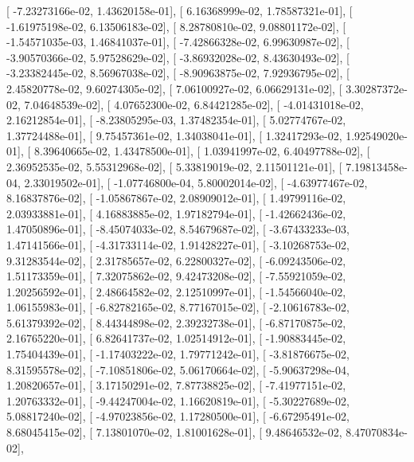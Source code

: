 \documentclass{article}
\begin{document}
       [ -7.23273166e-02,   1.43620158e-01],
       [  6.16368999e-02,   1.78587321e-01],
       [ -1.61975198e-02,   6.13506183e-02],
       [  8.28780810e-02,   9.08801172e-02],
       [ -1.54571035e-03,   1.46841037e-01],
       [ -7.42866328e-02,   6.99630987e-02],
       [ -3.90570366e-02,   5.97528629e-02],
       [ -3.86932028e-02,   8.43630493e-02],
       [ -3.23382445e-02,   8.56967038e-02],
       [ -8.90963875e-02,   7.92936795e-02],
       [  2.45820778e-02,   9.60274305e-02],
       [  7.06100927e-02,   6.06629131e-02],
       [  3.30287372e-02,   7.04648539e-02],
       [  4.07652300e-02,   6.84421285e-02],
       [ -4.01431018e-02,   2.16212854e-01],
       [ -8.23805295e-03,   1.37482354e-01],
       [  5.02774767e-02,   1.37724488e-01],
       [  9.75457361e-02,   1.34038041e-01],
       [  1.32417293e-02,   1.92549020e-01],
       [  8.39640665e-02,   1.43478500e-01],
       [  1.03941997e-02,   6.40497788e-02],
       [  2.36952535e-02,   5.55312968e-02],
       [  5.33819019e-02,   2.11501121e-01],
       [  7.19813458e-04,   2.33019502e-01],
       [ -1.07746800e-04,   5.80002014e-02],
       [ -4.63977467e-02,   8.16837876e-02],
       [ -1.05867867e-02,   2.08909012e-01],
       [  1.49799116e-02,   2.03933881e-01],
       [  4.16883885e-02,   1.97182794e-01],
       [ -1.42662436e-02,   1.47050896e-01],
       [ -8.45074033e-02,   8.54679687e-02],
       [ -3.67433233e-03,   1.47141566e-01],
       [ -4.31733114e-02,   1.91428227e-01],
       [ -3.10268753e-02,   9.31283544e-02],
       [  2.31785657e-02,   6.22800327e-02],
       [ -6.09243506e-02,   1.51173359e-01],
       [  7.32075862e-02,   9.42473208e-02],
       [ -7.55921059e-02,   1.20256592e-01],
       [  2.48664582e-02,   2.12510997e-01],
       [ -1.54566040e-02,   1.06155983e-01],
       [ -6.82782165e-02,   8.77167015e-02],
       [ -2.10616783e-02,   5.61379392e-02],
       [  8.44344898e-02,   2.39232738e-01],
       [ -6.87170875e-02,   2.16765220e-01],
       [  6.82641737e-02,   1.02514912e-01],
       [ -1.90883445e-02,   1.75404439e-01],
       [ -1.17403222e-02,   1.79771242e-01],
       [ -3.81876675e-02,   8.31595578e-02],
       [ -7.10851806e-02,   5.06170664e-02],
       [ -5.90637298e-04,   1.20820657e-01],
       [  3.17150291e-02,   7.87738825e-02],
       [ -7.41977151e-02,   1.20763332e-01],
       [ -9.44247004e-02,   1.16620819e-01],
       [ -5.30227689e-02,   5.08817240e-02],
       [ -4.97023856e-02,   1.17280500e-01],
       [ -6.67295491e-02,   8.68045415e-02],
       [  7.13801070e-02,   1.81001628e-01],
       [  9.48646532e-02,   8.47070834e-02],
\end{document}
